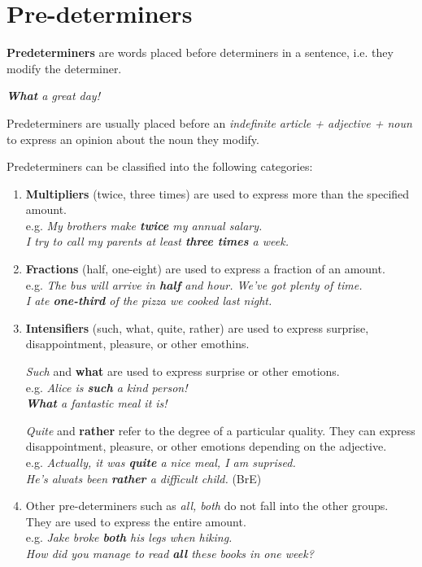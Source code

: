 \documentclass[hidelinks,10pt,a4paper]{article}
\begin{document}
\section{Pre-determiners}
\textbf{Predeterminers} are words placed before determiners in a sentence, i.e. they modify the determiner.

\begin{center}
	\textit{\textbf{What} a great day!}
\end{center}

Predeterminers are usually placed before an \textit{indefinite article + adjective + noun} to express an opinion about the noun they modify.

Predeterminers can be classified into the following categories:
\begin{enumerate}[label=(\alph*)]
	\item \textbf{Multipliers} (twice, three times) are used to express more than the specified amount. \\
		e.g. \textit{My brothers make \textbf{twice} my annual salary. \\
		I try to call my parents at least \textbf{three times} a week. }
	\item \textbf{Fractions} (half, one-eight) are used to express a fraction of an amount. \\
		e.g. \textit{The bus will arrive in \textbf{half} and hour. We've got plenty of time. \\
		I ate \textbf{one-third} of the pizza we cooked last night. }
	\item \textbf{Intensifiers} (such, what, quite, rather) are used to express surprise, disappointment, pleasure, or other emothins.
		\begin{center}
			\textit{Such} and \textbf{what} are used to express surprise or other emotions. \\
		e.g. \textit{Alice is \textbf{such} a kind person!\\
		\textbf{What} a fantastic meal it is! }
		\end{center}
		\begin{center}
			\textit{Quite} and \textbf{rather} refer to the degree of a particular quality. They can express disappointment, pleasure, or other emotions depending on the adjective. \\
			e.g. \textit{Actually, it was \textbf{quite} a nice meal, I am suprised.\\
			He's alwats been \textbf{rather} a difficult child. } (BrE)
		\end{center}
	\item Other pre-determiners such as \textit{all, both} do not fall into the other groups. They are used to express the entire amount. \\
		e.g. \textit{Jake broke \textbf{both} his legs when hiking.\\
		How did you manage to read \textbf{all} these books in one week? }
\end{enumerate}
\end{document}
